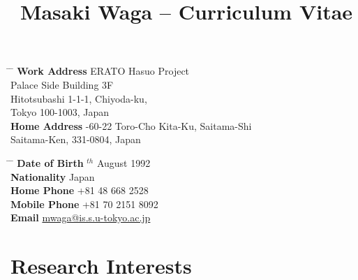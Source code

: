 \documentclass[10pt]{article} %
\begin{document}

\title{Masaki Waga -- Curriculum Vitae} %


\parbox{0.5\textwidth}{ %
\begin{tabbing} %
\hspace{3cm} \= \hspace{4cm} \= \kill %
{\bf Work Address} \> ERATO Hasuo Project\\
\>Palace Side Building 3F\\
\> Hitotsubashi 1-1-1, Chiyoda-ku,\\
\> Tokyo 100-1003, Japan\\
{\bf Home Address} -60-22 Toro-Cho Kita-Ku, Saitama-Shi \\ %
\> Saitama-Ken, 331-0804, Japan \\ %
\end{tabbing}}
\hfill %
\parbox{0.5\textwidth}{ %
\begin{tabbing} %
\hspace{3cm} \= \hspace{4cm} \= \kill %
{\bf Date of Birth} $^{th}$ August 1992 \\ %
{\bf Nationality} \> Japan\\ %
{\bf Home Phone} \> +81 48 668 2528 \\ %
{\bf Mobile Phone} \> +81 70 2151 8092\\ %
{\bf Email} \> \href{mailto:mwaga@is.s.u-tokyo.ac.jp}{mwaga@is.s.u-tokyo.ac.jp} \\ %
\end{tabbing}}


\section{Research Interests}
\end{document}
